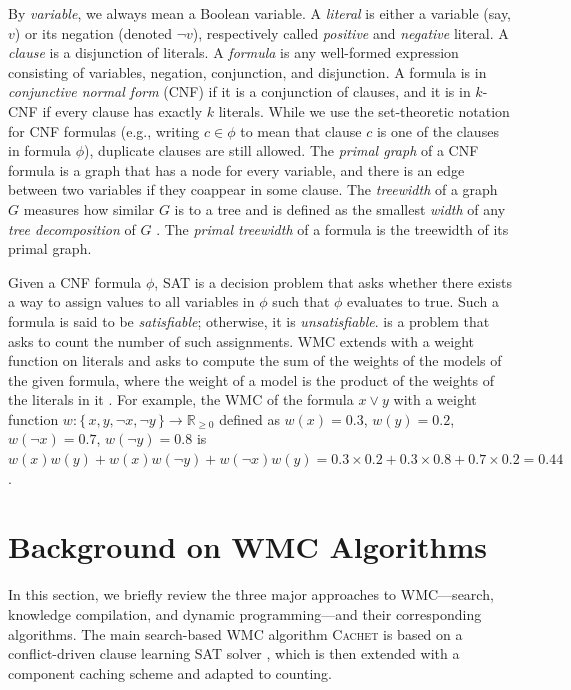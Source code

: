 
By \emph{variable}, we always mean a Boolean variable. A \emph{literal} is
either a variable (say, $v$) or its negation (denoted $\neg v$), respectively
called \emph{positive} and \emph{negative} literal. A \emph{clause} is a
disjunction of literals. A \emph{formula} is any well-formed expression
consisting of variables, negation, conjunction, and disjunction. A formula is in
\emph{conjunctive normal form} (CNF) if it is a conjunction of clauses, and it
is in $k$-CNF if every clause has exactly $k$ literals. While we use the
set-theoretic notation for CNF formulas (e.g., writing $c \in \phi$ to mean that
clause $c$ is one of the clauses in formula $\phi$), duplicate clauses are still
allowed. The \emph{primal graph} of a CNF formula is a graph that has a node for
every variable, and there is an edge between two variables if they coappear in
some clause. The \emph{treewidth} of a graph $G$ measures how similar $G$
is to a tree and is defined as the smallest \emph{width} of any \emph{tree
  decomposition} of $G$ \citep{DBLP:journals/jct/RobertsonS84}. The \emph{primal
  treewidth} of a formula is the treewidth of its primal graph.

Given a CNF formula $\phi$, SAT is a decision problem that asks whether there
exists a way to assign values to all variables in $\phi$ such that $\phi$
evaluates to true. Such a formula is said to be \emph{satisfiable}; otherwise,
it is \emph{unsatisfiable}. \mc{} is a problem that asks to count the number of
such assignments. WMC extends \mc{} with a weight function on literals and asks
to compute the sum of the weights of the models of the given formula, where the
weight of a model is the product of the weights of the literals in it
\citep{DBLP:journals/ai/ChaviraD08}. For example, the WMC of the formula
$x \lor y$ with a weight function
$w\colon \{\,x, y, \neg x, \neg y\,\} \to \mathbb{R}_{\ge 0}$ defined as
$w(x) = 0.3$, $w(y) = 0.2$, $w(\neg x) = 0.7$, $w(\neg y) = 0.8$ is
$w(x)w(y)+w(x)w(\neg y)+w(\neg x)w(y) = 0.3 \times 0.2 + 0.3 \times 0.8 + 0.7 \times 0.2 = 0.44$.

\section{Background on \textsf{\textmd{WMC}} Algorithms}\label{sec:background}

In this section, we briefly review the three major approaches to WMC---search,
knowledge compilation, and dynamic programming---and their corresponding
algorithms. The main search-based WMC algorithm \textsc{Cachet}
\citep{DBLP:conf/sat/SangBBKP04} is based on a conflict-driven clause learning
SAT solver \citep{DBLP:conf/dac/MoskewiczMZZM01}, which is then extended with a
component caching scheme and adapted to counting.

